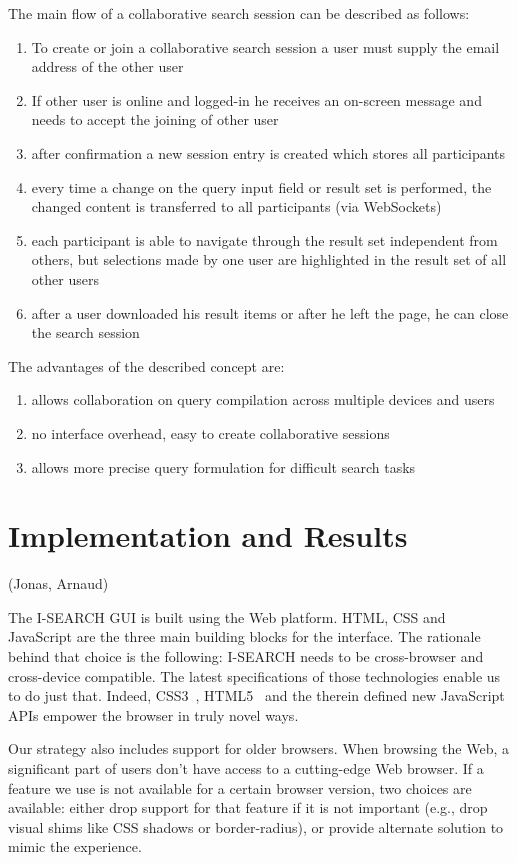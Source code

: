 \documentclass[runningheads,a4paper]{llncs} \usepackage[utf8]{inputenc}
\begin{document}
The main flow of a collaborative search session can be described as follows:
\begin{enumerate}
  \item To create or join a collaborative search session a user must supply the
  email address of the other user
  \item If other user is online and logged-in he receives an on-screen message
  and needs to accept the joining of other user
  \item after confirmation a new session entry is created which stores all
  participants
  \item every time a change on the query input field or result set is performed,
  the changed content is transferred to all participants (via WebSockets)
  \item each participant is able to navigate through the result set independent
  from others, but selections made by one user are highlighted in the result set of all other users
  \item after a user downloaded his result items or after he left the page, he
  can close the search session
\end{enumerate}

The advantages of the described concept are:
\begin{enumerate}
  \item allows collaboration on query compilation across multiple devices and
  users
  \item no interface overhead, easy to create collaborative sessions
  \item allows more precise query formulation for difficult search tasks
\end{enumerate}

\section{Implementation and Results}
(Jonas, Arnaud)

The \mbox{I-SEARCH} GUI is built using the Web platform. HTML, CSS and JavaScript are the three main building blocks for the interface. The rationale behind that choice is the following: \mbox{I-SEARCH} needs to be cross-browser and cross-device compatible. The latest specifications of those technologies enable us to do just that. Indeed, CSS3~\cite{css3}, HTML5~\cite{html5} and the therein defined new JavaScript APIs empower the browser in truly novel ways.

Our strategy also includes support for older browsers. When browsing the Web, a significant part of users don't have access to a cutting-edge Web browser. If a feature we use is not available for a certain browser version, two choices are available: either drop support for that feature if it is not important (e.g., drop visual shims like CSS shadows or border-radius), or provide alternate solution to mimic the experience. 
\end{document}

